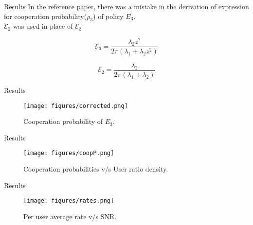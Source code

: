 \documentclass{beamer}
\begin{document}
\begin{frame}{Results}
In the reference paper, there was a mistake in the derivation of expression for cooperation probability($\rho_3$) of policy $E_3$. \\
$\mathcal{E}_2$ was used in place of $\mathcal{E}_3$

\begin{equation*}
\mathcal{E}_3 = \frac{\lambda_2 z^2}{2\pi(\lambda_1+\lambda_2z^2)}
\end{equation*}

\begin{equation*}
\mathcal{E}_2 = \frac{\lambda_2}{2\pi(\lambda_1+\lambda_2)}
\end{equation*}
\end{frame}

\begin{frame}{Results}
\begin{figure}[!h]
\texttt{[image: figures/corrected.png]}
\centering
\vspace{-2mm}
\caption{Cooperation probability of $E_3$.}
\label{plot1}
\end{figure}
\end{frame}


\begin{frame}{Results}
\begin{figure}[!h]
\texttt{[image: figures/coopP.png]}
\centering
\vspace{-2mm}
\caption{Cooperation probabilities v/s User ratio density. } 
\label{plot2}
\end{figure}
\end{frame}


\begin{frame}{Results}
\begin{figure}[!h]
\texttt{[image: figures/rates.png]}
\centering
\vspace{-2mm}
\caption{Per user average rate v/s SNR.}
\label{plot3}
\end{figure}
\end{frame}






\end{document}
